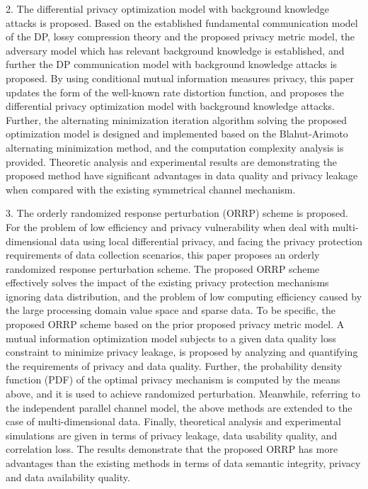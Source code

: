 \begin{englishabstract}
2. The differential privacy optimization model with background knowledge attacks is proposed. Based on the established fundamental communication model of the DP, lossy compression theory and the proposed privacy metric model, the adversary model which has relevant background knowledge is established, and further the DP communication model with background knowledge attacks is proposed. By using conditional mutual information measures privacy, this paper updates the form of the well-known rate distortion function, and proposes the differential privacy optimization model with background knowledge attacks. Further, the alternating minimization iteration algorithm solving the proposed optimization model is designed and implemented based on the Blahut-Arimoto alternating minimization method, and the computation complexity analysis is provided. Theoretic analysis and experimental results are demonstrating the proposed method have significant advantages in data quality and privacy leakage when compared with the existing symmetrical channel mechanism.


3. The orderly randomized response perturbation (ORRP) scheme is proposed. For the problem of low efficiency and privacy vulnerability when deal with multi-dimensional data using local differential privacy, and facing the privacy protection requirements of data collection scenarios, this paper proposes an orderly randomized response perturbation scheme. The proposed ORRP scheme effectively solves the impact of the existing privacy protection mechanisms ignoring data distribution, and the problem of low computing efficiency caused by the large processing domain value space and sparse data. To be specific, the proposed ORRP scheme based on the prior proposed privacy metric model. A mutual information optimization model subjects to a given data quality loss constraint to minimize privacy leakage, is proposed by analyzing and quantifying the requirements of privacy and data quality. Further, the probability density function (PDF) of the optimal privacy mechanism is computed by the means above, and it is used to achieve randomized perturbation. Meanwhile, referring to the independent parallel channel model, the above methods are extended to the case of multi-dimensional data. Finally, theoretical analysis and experimental simulations are given in terms of privacy leakage, data usability quality, and correlation loss. The results demonstrate that the proposed ORRP has more advantages than the existing methods in terms of data semantic integrity, privacy and data availability quality.



\end{englishabstract}
